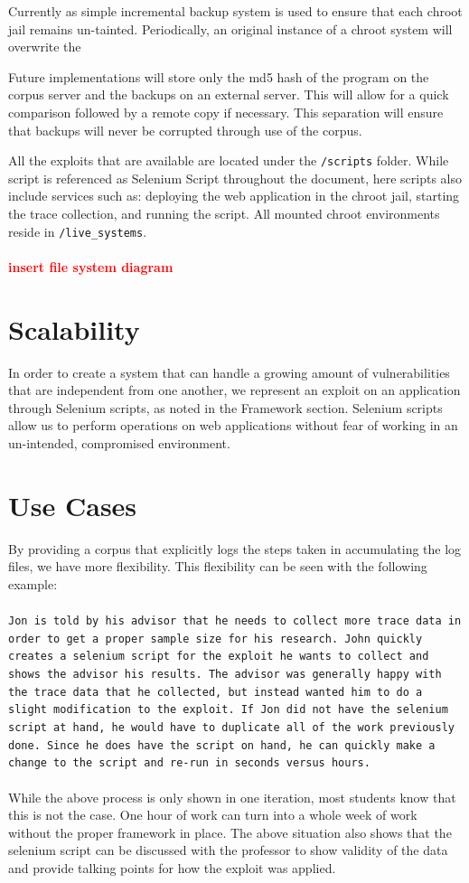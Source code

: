 \documentclass[letterpaper,twocolumn,10pt]{article}
\begin{document}
Currently as simple incremental backup system is used to ensure that each chroot jail remains un-tainted. Periodically, an original instance of a chroot system will overwrite the 

Future implementations will store only the md5 hash of the program on the corpus server and the backups on an external server.  This will allow for a quick comparison followed by a remote copy if necessary.  This separation will ensure that backups will never be corrupted through use of the corpus.  

All the exploits that are available are located under the {\tt /scripts} folder.  While script is referenced as Selenium Script throughout the document, here scripts also include services such as: deploying the web application in the chroot jail, starting the trace collection, and running the script. All mounted chroot environments reside in {\tt /live\_systems}. 
\\\\
\textcolor{red}{
{\bf insert file system diagram}
}


\section{Scalability}
In order to create a system that can handle a growing amount of vulnerabilities that are independent from one another, we represent an exploit on an application through  Selenium scripts, as noted in the Framework section.  Selenium scripts allow us to perform operations on web applications without fear of working in an un-intended, compromised environment. 

\section{Use Cases}
By providing a corpus that explicitly logs the steps taken in accumulating the log files, we have more flexibility.  This flexibility can be seen with the following example:  
\\\\
{\tt Jon is told by his advisor that he needs to collect more trace data in order to get a proper sample size for his research.  John quickly creates a selenium script for the exploit he wants to collect and shows the advisor his results.  The advisor was generally happy with the trace data that he collected, but instead wanted him to do a slight modification to the exploit.  If Jon did not have the selenium script at hand, he would have to duplicate all of the work previously done.  Since he does have the script on hand, he can quickly make a change to the script and re-run in seconds versus hours.}
\\\\
While the above process is only shown in one iteration, most students know that this is not the case.  One hour of work can turn into a whole week of work without the proper framework in place.  The above situation also shows that the selenium script can be discussed with the professor to show validity of the data and provide talking points for how the exploit was applied.
\end{document}
